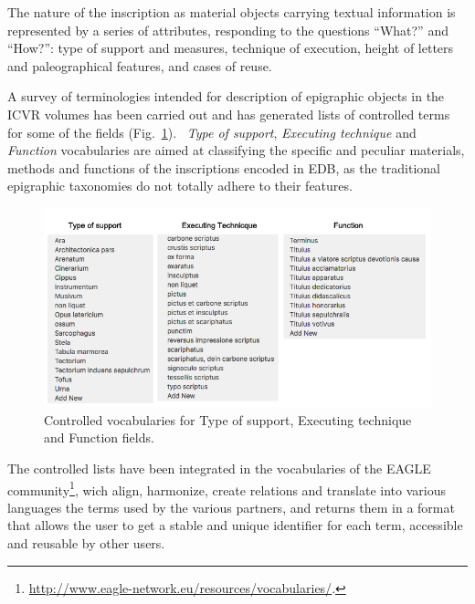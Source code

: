 \documentclass[amsthm,ebook]{saparticle}
\begin{document}
The nature of the inscription as material objects carrying textual information is represented by a series of attributes,
responding to the questions “What?” and “How?”: type of support and measures, technique of execution, height of letters
and paleographical features, and cases of reuse.

A survey of terminologies intended for description of epigraphic objects in the ICVR volumes has been carried out and
has generated lists of controlled terms for some of the fields (Fig.~\ref{fig:8}). \ \emph{Type of support}, \emph{Executing technique} and
\emph{Function} vocabularies are aimed at classifying the specific and peculiar materials, methods and functions of the
inscriptions encoded in EDB, as the traditional epigraphic taxonomies do not totally adhere to their features.

\begin{figure}[hbp]
\centering
 \includegraphics[width=\columnwidth]{EAGLE2016Roccoengrev-img008.png}
\caption{Controlled vocabularies for Type of support, Executing technique and Function fields.}
\label{fig:8}
\end{figure}



The controlled lists have been integrated in the vocabularies of the EAGLE community\footnote{
\url{http://www.eagle-network.eu/resources/vocabularies/}.}, wich align, harmonize, create relations and translate into
various languages the terms used by the various partners, and returns them in a format that allows the user to get a
stable and unique identifier for each term, accessible and reusable by other users.
\end{document}
